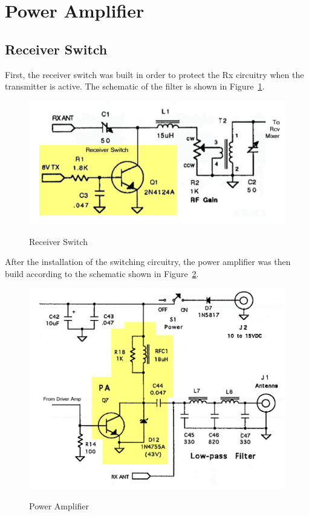 \section{Power Amplifier}

\subsection{Receiver Switch}
First, the receiver switch was built in order to protect the Rx circuitry when
the transmitter is active. The schematic of the filter is shown in
Figure~\ref{fig:RxSwitch}.

\begin{figure}[h!]
  \centering
  \includegraphics[scale=0.8]{./img/RxSwitch.png}
  \label{fig:RxSwitch}
  \caption{Receiver Switch}
\end{figure}

After the installation of the switching circuitry, the power amplifier was then
build according to the schematic shown in Figure~\ref{fig:powamp}.

\begin{figure}[h!]
  \centering
  \includegraphics[scale=0.7]{./img/powamp.png}
  \label{fig:powamp}
  \caption{Power Amplifier}
\end{figure}

